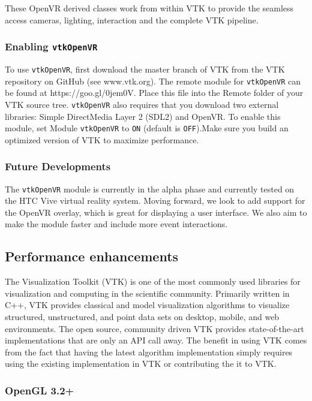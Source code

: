 These OpenVR derived classes work from within VTK to provide the seamless access cameras, lighting, interaction and the complete VTK pipeline.

\subsubsection{Enabling \texttt{vtkOpenVR}}

To use \texttt{vtkOpenVR}, first download the master branch of VTK from the VTK repository on GitHub (see www.vtk.org). The remote module for \texttt{vtkOpenVR} can be found at https://goo.gl/0jem0V. Place this file into the Remote folder of your VTK source tree. \texttt{vtkOpenVR} also requires that you download two external libraries: Simple DirectMedia Layer 2 (SDL2) and OpenVR. To enable this module, set Module \texttt{vtkOpenVR} to \texttt{ON} (default is \texttt{OFF}).Make sure you build an optimized version of VTK to maximize performance.

\subsubsection{Future Developments}

The \texttt{vtkOpenVR}  module is currently in the alpha phase and currently tested on the HTC Vive virtual reality system. Moving forward, we look to add support for the OpenVR overlay, which is great for displaying a user interface. We also aim to make the module faster and include more event interactions. 

\subsection{Performance enhancements}

The Visualization Toolkit (VTK) is one of the most commonly used libraries for visualization and computing in the scientific community. Primarily written in C++, VTK provides classical and model visualization algorithms to visualize structured, unstructured, and point data sets on desktop, mobile, and web environments. The open source, community driven VTK provides state-of-the-art implementations that are only an API call away. The benefit in using VTK comes from the fact that having the latest algorithm implementation simply requires using the existing implementation in VTK or contributing the it to VTK.

\subsubsection{OpenGL 3.2+}

